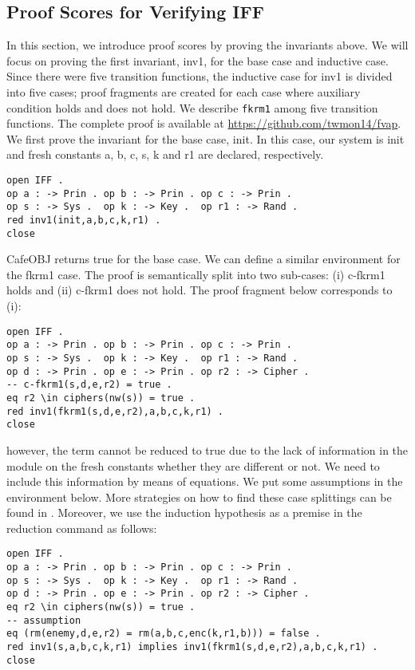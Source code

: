 \documentclass[a4paper,fleqn]{cas-dc}
\begin{document}
\subsection{Proof Scores for Verifying IFF} \label{pscores}
In this section, we introduce proof scores by proving the invariants above. We will focus on proving the first invariant, inv1, for the base case and inductive case. Since there were five transition functions, the inductive case for inv1 is divided into five cases; proof fragments are created for each case where auxiliary condition holds and does not hold. We describe \verb!fkrm1! among five transition functions. The complete proof is available at \url{https://github.com/twmon14/fvap}. We first prove the invariant for the base case, init. In this case, our system is init and fresh constants a, b, c, s, k and r1 are declared, respectively.
\begin{small}
\begin{verbatim}
open IFF .
op a : -> Prin . op b : -> Prin . op c : -> Prin .
op s : -> Sys .  op k : -> Key .  op r1 : -> Rand .
red inv1(init,a,b,c,k,r1) .
close
\end{verbatim}
\end{small}
CafeOBJ returns true for the base case. We can define a similar environment for the fkrm1 case. The proof is semantically split into two sub-cases: (i) c-fkrm1 holds and (ii) c-fkrm1 does not hold. The proof fragment below corresponds to (i):
\begin{small}
\begin{verbatim}
open IFF .
op a : -> Prin . op b : -> Prin . op c : -> Prin .
op s : -> Sys .  op k : -> Key .  op r1 : -> Rand .
op d : -> Prin . op e : -> Prin . op r2 : -> Cipher .
-- c-fkrm1(s,d,e,r2) = true .
eq r2 \in ciphers(nw(s)) = true .
red inv1(fkrm1(s,d,e,r2),a,b,c,k,r1) .
close
\end{verbatim}
\end{small}
however, the term cannot be reduced to true due to the lack of information in the module on the fresh constants whether they are different or not. We need to include this information by means of equations. We put some assumptions in the environment below. More strategies on how to find these case splittings can be found in \cite{OgataF03fmoods, Ogata2006, nakano2003}. Moreover, we use the induction hypothesis as a premise in the reduction command as follows:
\begin{small}
\begin{verbatim}
open IFF .
op a : -> Prin . op b : -> Prin . op c : -> Prin .
op s : -> Sys .  op k : -> Key .  op r1 : -> Rand .
op d : -> Prin . op e : -> Prin . op r2 : -> Cipher .
eq r2 \in ciphers(nw(s)) = true .
-- assumption
eq (rm(enemy,d,e,r2) = rm(a,b,c,enc(k,r1,b))) = false .
red inv1(s,a,b,c,k,r1) implies inv1(fkrm1(s,d,e,r2),a,b,c,k,r1) .
close
\end{verbatim}
\end{small}
\end{document}
